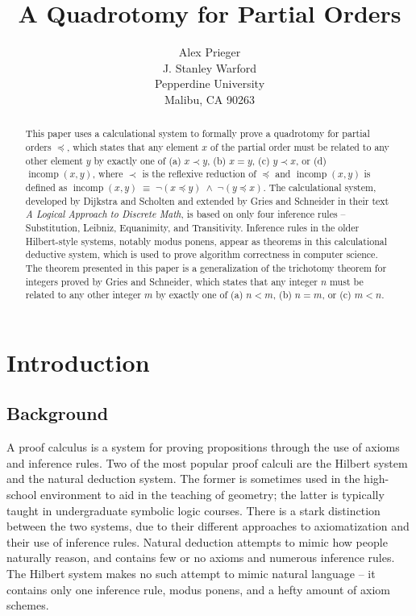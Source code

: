 \documentclass[12pt, fleqn, leqno]{article}
\title{A Quadrotomy for Partial Orders}
\author{
   Alex Prieger\\
   J. Stanley Warford\\
   Pepperdine University\\
   Malibu, CA 90263}
\date{} %
\newcommand{\equivs}{\ensuremath{\;\equiv\;}}       %
\newcommand{\lands}{\ensuremath{\;\land\;}}      %
\DeclareMathOperator{\incomp}{incomp}
\begin{document}
\maketitle
\begin{abstract}

This paper uses a calculational system to formally prove a quadrotomy for partial orders $\preceq$, which states that any element $x$ of the partial order must be related to any other element $y$ by exactly one of (a) $x \prec y$, (b) $x=y$, (c) $y\prec x$, or (d) $\incomp(x,y)$, where $\prec$ is the reflexive reduction of $\preceq$ and $\incomp(x,y)$ is defined as $\incomp(x,y) \equivs \neg (x\preceq y) \lands \neg (y\preceq x)$.
The calculational system, developed by Dijkstra and Scholten and extended by Gries and Schneider in their text \textit{A Logical Approach to Discrete Math}, is based on only four inference rules -- Substitution, Leibniz, Equanimity, and Transitivity. 
Inference rules in the older Hilbert-style systems, notably modus ponens, appear as theorems in this calculational deductive system, which is used to prove algorithm correctness in computer science.
The theorem presented in this paper is a generalization of the trichotomy theorem for integers proved by Gries and Schneider, which states that any integer $n$ must be related to any other integer $m$ by exactly one of (a) $n<m$, (b) $n=m$, or (c) $m<n$.

\end{abstract}

\thispagestyle{plain}

\section{Introduction}

\subsection{Background}

A proof calculus is a system for proving propositions through the use of axioms and inference rules. Two of the most popular proof calculi are the Hilbert system and the natural deduction system. The former is sometimes used in the high-school environment to aid in the teaching of geometry; the latter is typically taught in undergraduate symbolic logic courses. There is a stark distinction between the two systems, due to their different approaches to axiomatization and their use of inference rules. Natural deduction attempts to mimic how people naturally reason, and contains few or no axioms and numerous inference rules. The Hilbert system makes no such attempt to mimic natural language -- it contains only one inference rule, modus ponens, and a hefty amount of axiom schemes.
\end{document}
